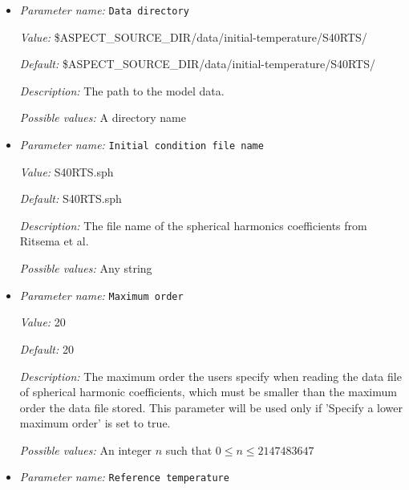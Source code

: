 \begin{itemize}
\item {\it Parameter name:} {\tt Data directory}
\label{parameters:Initial temperature model/S40RTS perturbation/Data directory}
\label{parameters:Initial_20temperature_20model/S40RTS_20perturbation/Data_20directory}


{\it Value:} \$ASPECT\_SOURCE\_DIR/data/initial-temperature/S40RTS/


{\it Default:} \$ASPECT\_SOURCE\_DIR/data/initial-temperature/S40RTS/


{\it Description:} The path to the model data. 


{\it Possible values:} A directory name
\item {\it Parameter name:} {\tt Initial condition file name}
\label{parameters:Initial temperature model/S40RTS perturbation/Initial condition file name}
\label{parameters:Initial_20temperature_20model/S40RTS_20perturbation/Initial_20condition_20file_20name}


{\it Value:} S40RTS.sph


{\it Default:} S40RTS.sph


{\it Description:} The file name of the spherical harmonics coefficients from Ritsema et al.


{\it Possible values:} Any string
\item {\it Parameter name:} {\tt Maximum order}
\label{parameters:Initial temperature model/S40RTS perturbation/Maximum order}
\label{parameters:Initial_20temperature_20model/S40RTS_20perturbation/Maximum_20order}


{\it Value:} 20


{\it Default:} 20


{\it Description:} The maximum order the users specify when reading the data file of spherical harmonic coefficients, which must be smaller than the maximum order the data file stored. This parameter will be used only if 'Specify a lower maximum order' is set to true.


{\it Possible values:} An integer $n$ such that $0\leq n \leq 2147483647$
\item {\it Parameter name:} {\tt Reference temperature}
\label{parameters:Initial temperature model/S40RTS perturbation/Reference temperature}
\label{parameters:Initial_20temperature_20model/S40RTS_20perturbation/Reference_20temperature}



\end{itemize}
